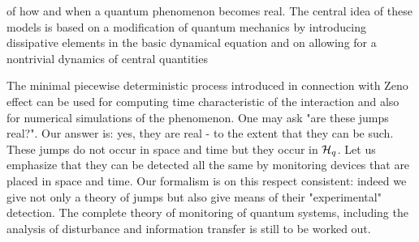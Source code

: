 of how and when a quantum phenomenon becomes real. The central idea of
these models is based on a modification of quantum mechanics by
introducing dissipative elements in the basic dynamical equation and
on allowing for a nontrivial dynamics of central quantities
\par
The minimal piecewise deterministic process introduced in
connection with Zeno effect can be used for computing time
characteristic of the interaction and also for numerical
simulations of the phenomenon. One may ask "are these jumps
{real}?". Our answer is: yes, they are {real} -
to the extent that they can be such. These jumps do not occur in space
and time but they occur in ${\cal H}_q$. Let us emphasize that they
can be detected all the same by monitoring devices that are placed in
space and time. Our formalism is on this respect consistent:
indeed we give not only a theory of jumps but also give means of their
"experimental" detection. The complete theory of monitoring of
quantum systems, including the analysis of disturbance and
information transfer is still to be worked out.

